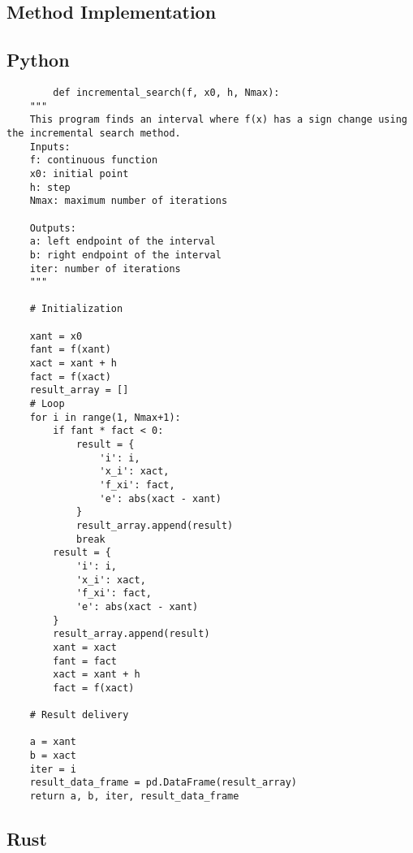 \documentclass{article}
\begin{document}
    \subsection{Method Implementation}
    \subsection{Python}
    \begin{verbatim}
        def incremental_search(f, x0, h, Nmax):
    """
    This program finds an interval where f(x) has a sign change using the incremental search method.
    Inputs:
    f: continuous function
    x0: initial point
    h: step
    Nmax: maximum number of iterations

    Outputs:
    a: left endpoint of the interval
    b: right endpoint of the interval
    iter: number of iterations
    """

    # Initialization

    xant = x0
    fant = f(xant)
    xact = xant + h
    fact = f(xact)
    result_array = []
    # Loop
    for i in range(1, Nmax+1):
        if fant * fact < 0:
            result = {
                'i': i,
                'x_i': xact,
                'f_xi': fact,
                'e': abs(xact - xant)
            }
            result_array.append(result)
            break
        result = {
            'i': i,
            'x_i': xact,
            'f_xi': fact,
            'e': abs(xact - xant)
        }
        result_array.append(result)
        xant = xact
        fant = fact
        xact = xant + h
        fact = f(xact)

    # Result delivery

    a = xant
    b = xact
    iter = i
    result_data_frame = pd.DataFrame(result_array)
    return a, b, iter, result_data_frame
        \end{verbatim}

    \subsection{Rust}\label{subsec:rust}
\end{document}
